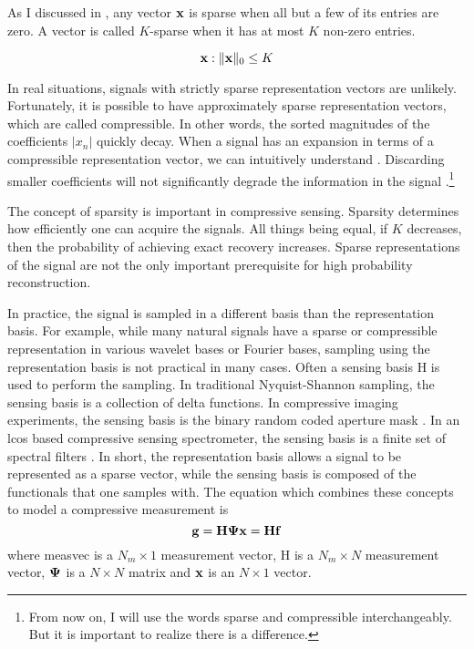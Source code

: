 As I discussed in , any vector $\mathbf{x}$ is \gls{sparse} when all but a few of its entries are zero. A vector is called $K$-sparse when it has at most $K$ non-zero entries. 

\begin{equation}
	\mathbf{x} : \| \mathbf{x} \|_0 \leq K
\end{equation} 


In real situations, signals with strictly sparse representation vectors are unlikely. Fortunately, it is possible to have approximately sparse representation vectors, which are called \gls{compressible}. In other words, the sorted magnitudes of the coefficients $|x_n|$ quickly decay. When a signal has an expansion in terms of a compressible representation vector, we can intuitively understand . Discarding smaller coefficients will not significantly degrade the information in the signal \cite{candes2008introduction}.\footnote{From now on, I will use the words \gls{sparse} and \gls{compressible} interchangeably. But it is important to realize there is a difference.} 

The concept of \gls{sparsity} is important in compressive sensing. Sparsity determines how efficiently one can acquire the signals. All things being equal, if $K$ decreases, then the probability of achieving exact recovery increases. Sparse representations of the signal are not the only important prerequisite for high probability reconstruction.



In practice, the signal is sampled in a different basis than the representation basis. For example, while many natural signals have a sparse or compressible representation in various wavelet bases or Fourier bases, sampling using the representation basis is not practical in many cases. Often a sensing basis \gls{H} is used to perform the sampling. In traditional Nyquist-Shannon sampling, the sensing basis is a collection of delta functions. In \gls{compressive imaging} experiments, the sensing basis is the binary random coded aperture mask \cite{duarte2008single}. In an \gls{lcos} based compressive sensing spectrometer, the sensing basis is a finite set of spectral filters \cite{oiknine2016along, yuan2015compressive}. In short, the representation basis allows a signal to be represented as a sparse vector, while the sensing basis is composed of the functionals that one samples with. The equation which combines these concepts to model a compressive measurement is
%
\begin{equation}
	\mathbf{g} = \mathbf{H} \mathbf{\Psi} \mathbf{x} = \mathbf{H} \mathbf{f}
	\label{eq:gHf2}
\end{equation}
%
where \gls{measvec} is a $N_m \times 1$ measurement vector, \gls{H} is a $N_m \times N$ measurement vector, $\mathbf{\Psi}$ is a $N \times N$ matrix and $\mathbf{x}$ is an $N \times 1$ vector. 

